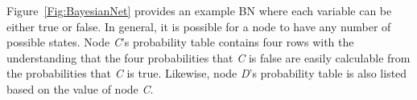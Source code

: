 \documentclass[conference]{IEEEtran}
\begin{document}
Figure~\ref{Fig:BayesianNet} provides an example BN where each variable can be  either true or false. In general, it is possible for a node to have any number of possible states. Node \emph{C}'s probability table contains four rows with the understanding that the four probabilities that \emph{C} is false are easily calculable from the probabilities that \emph{C} is true. Likewise, node \emph{D}'s probability table is also listed based on the value of node \emph{C}.




\end{document}

